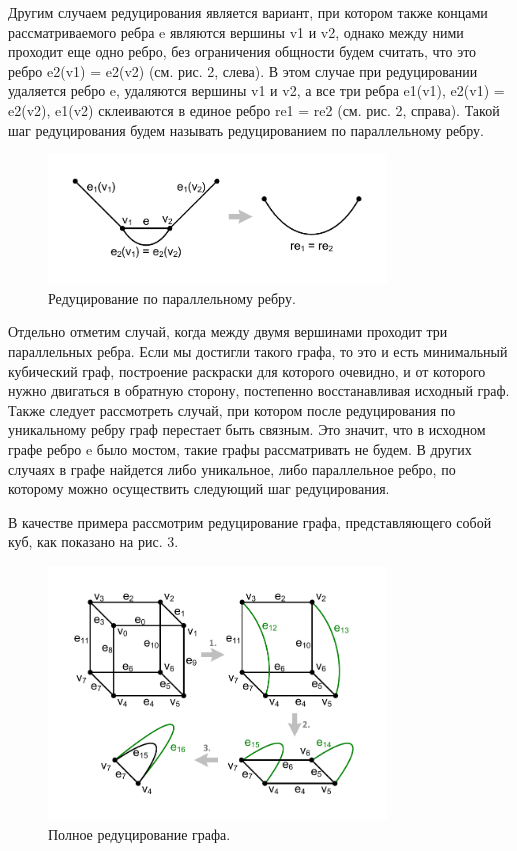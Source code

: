 Другим случаем редуцирования является вариант, при котором также концами рассматриваемого ребра e являются вершины v1 и v2, однако между ними проходит еще одно ребро, без ограничения общности будем считать, что это ребро e2(v1) = e2(v2) (см. рис. 2, слева).
В этом случае при редуцировании удаляется ребро e, удаляются вершины v1 и v2, а все три ребра e1(v1), e2(v1) = e2(v2), e1(v2) склеиваются в единое ребро re1 = re2 (см. рис. 2, справа).
Такой шаг редуцирования будем называть редуцированием по параллельному ребру.

\begin{figure}[ht]
\centering
\includegraphics[width=0.8\textwidth]{./pics/text_3_edge_coloring/2-pic-reduce-edge-type-2.pdf}
\singlespacing
{}\caption{Редуцирование по параллельному ребру.}
\label{fig:text_3_edge_coloring_2}
\end{figure}

Отдельно отметим случай, когда между двумя вершинами проходит три параллельных ребра. Если мы достигли такого графа, то это и есть минимальный кубический граф, построение раскраски для которого очевидно, и от которого нужно двигаться в обратную сторону, постепенно восстанавливая исходный граф.
Также следует рассмотреть случай, при котором после редуцирования по уникальному ребру граф перестает быть связным.
Это значит, что в исходном графе ребро e было мостом, такие графы рассматривать не будем. В других случаях в графе найдется либо уникальное, либо параллельное ребро, по которому можно осуществить следующий шаг редуцирования.

В качестве примера рассмотрим редуцирование графа, представляющего собой куб, как показано на рис. 3.

\begin{figure}[ht]
\centering
\includegraphics[width=0.8\textwidth]{./pics/text_3_edge_coloring/3-reduce-0.pdf}
\singlespacing
{}\caption{Полное редуцирование графа.}
\label{fig:text_3_edge_coloring_3}
\end{figure}

